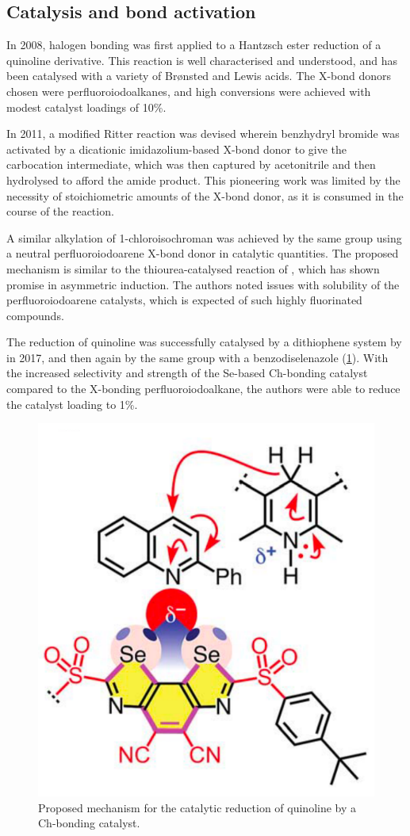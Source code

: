 \begin{refsection}
\subsection{Catalysis and bond activation}
In 2008, halogen bonding was first applied to a Hantzsch ester reduction of a quinoline derivative.\autocite{Bruckmann2008}
This reaction is well characterised and understood, and has been catalysed with a variety of Br\o nsted and Lewis acids.
The X-bond donors chosen were perfluoroiodoalkanes, and high conversions were achieved with modest catalyst loadings of 10\%.

In 2011, a modified Ritter reaction was devised wherein benzhydryl bromide was activated by a dicationic imidazolium-based X-bond donor to give the carbocation intermediate, which was then captured by acetonitrile and then hydrolysed to afford the amide product.\autocite{Walter2011}
This pioneering work was limited by the necessity of stoichiometric amounts of the X-bond donor, as it is consumed in the course of the reaction.

A similar alkylation of 1-chloroisochroman was achieved by the same group using a neutral perfluoroiodoarene X-bond donor in catalytic quantities.\autocite{Kniep2013}
The proposed mechanism is similar to the thiourea-catalysed reaction of \citeauthor{Reisman2008}\autocite{Reisman2008}, which has shown promise in asymmetric induction.
The authors noted issues with solubility of the perfluoroiodoarene catalysts, which is expected of such highly fluorinated compounds.

The reduction of quinoline was successfully catalysed by a dithiophene system by \citeauthor{Benz2017} in 2017\autocite{Benz2017}, and then again by the same group with a benzodiselenazole (\cref{fig:quinoline-redn}).\autocite{Benz2017a}
With the increased selectivity and strength of the Se-based Ch-bonding catalyst compared to the X-bonding perfluoroiodoalkane, the authors were able to reduce the catalyst loading to 1\%.

\begin{figure}
    \centering
    \includegraphics[width=0.4\linewidth]{Figures/quinoline-redn.pdf}
    \caption{Proposed mechanism for the catalytic reduction of quinoline by a Ch-bonding catalyst.\autocite{Benz2017}}\label{fig:quinoline-redn}
\end{figure}


\end{refsection}
